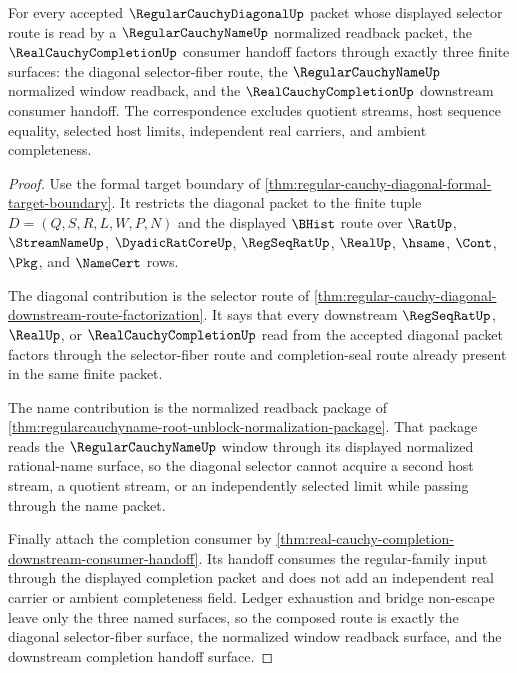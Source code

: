 \begin{theorem}
\label{thm:regular-cauchy-diagonal-name-normalization-handoff}
For every accepted $\RegularCauchyDiagonalUp$ packet whose displayed selector route is read by a $\RegularCauchyNameUp$ normalized readback packet, the $\RealCauchyCompletionUp$ consumer handoff factors through exactly three finite surfaces: the diagonal selector-fiber route, the $\RegularCauchyNameUp$ normalized window readback, and the $\RealCauchyCompletionUp$ downstream consumer handoff. The correspondence excludes quotient streams, host sequence equality, selected host limits, independent real carriers, and ambient completeness.
\end{theorem}
\begin{proof}
Use the formal target boundary of \autoref{thm:regular-cauchy-diagonal-formal-target-boundary}. It restricts the diagonal packet to the finite tuple $D=(Q,S,R,L,W,P,N)$ and the displayed $\BHist$ route over $\RatUp$, $\StreamNameUp$, $\DyadicRatCoreUp$, $\RegSeqRatUp$, $\RealUp$, $\hsame$, $\Cont$, $\Pkg$, and $\NameCert$ rows.

The diagonal contribution is the selector route of \autoref{thm:regular-cauchy-diagonal-downstream-route-factorization}. It says that every downstream $\RegSeqRatUp$, $\RealUp$, or $\RealCauchyCompletionUp$ read from the accepted diagonal packet factors through the selector-fiber route and completion-seal route already present in the same finite packet.

The name contribution is the normalized readback package of \autoref{thm:regularcauchyname-root-unblock-normalization-package}. That package reads the $\RegularCauchyNameUp$ window through its displayed normalized rational-name surface, so the diagonal selector cannot acquire a second host stream, a quotient stream, or an independently selected limit while passing through the name packet.

Finally attach the completion consumer by \autoref{thm:real-cauchy-completion-downstream-consumer-handoff}. Its handoff consumes the regular-family input through the displayed completion packet and does not add an independent real carrier or ambient completeness field. Ledger exhaustion and bridge non-escape leave only the three named surfaces, so the composed route is exactly the diagonal selector-fiber surface, the normalized window readback surface, and the downstream completion handoff surface.
\end{proof}

